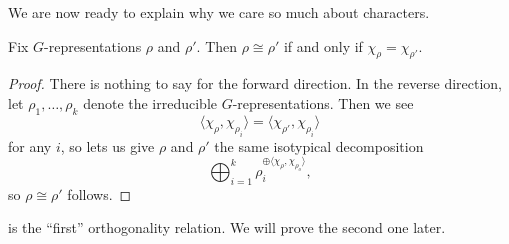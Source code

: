 \documentclass{article}
\begin{document}
We are now ready to explain why we care so much about characters.
\begin{corollary}
	Fix $G$-representations $\rho$ and $\rho'$. Then $\rho\cong\rho'$ if and only if $\chi_\rho=\chi_{\rho'}$.
\end{corollary}
\begin{proof}
	There is nothing to say for the forward direction. In the reverse direction, let $\rho_1,\ldots,\rho_k$ denote the irreducible $G$-representations. Then we see
	\[\langle\chi_\rho,\chi_{\rho_i}\rangle=\langle\chi_{\rho'},\chi_{\rho_i}\rangle\]
	for any $i$, so  lets us give $\rho$ and $\rho'$ the same isotypical decomposition
	\[\bigoplus_{i=1}^k\rho_i^{\oplus\langle\chi_\rho,\chi_{\rho_o}\rangle},\]
	so $\rho\cong\rho'$ follows.
\end{proof}
 is the ``first'' orthogonality relation. We will prove the second one later.
\end{document}
